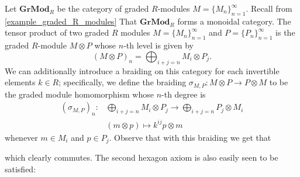 \begin{example}
    Let $\textbf{GrMod}_R$ be the category of graded $R$-modules 
    $M = \{M_n\}_{n = 1}^{\infty}$. Recall from 
    \ref{example_graded_R_modules} That $\textbf{GrMod}_R$ forms 
    a monoidal category.
    The tensor product 
    of two graded $R$ modules $M =\{M_n\}_{n=1}^{\infty}$ and $P = \{P_n\}_{n= 1}^{\infty}$ is the graded $R$-module $M\otimes P$ whose $n$-th level is given by
    \[
        (M \otimes P)_n = \bigoplus_{i + j = n}M_i \otimes P_j.
    \]  
    We can additionally introduce a braiding on this category for each invertible elements $k \in R$; specifically, we define the braiding 
    $\sigma_{M,P}: M \otimes P \to P \otimes M$ to be the graded module homomorphism whose $n$-th degree is 
    \begin{align*} 
        (\sigma_{M, P})_n: &\bigoplus_{i + j = n}M_i \otimes P_j
        \to 
        \bigoplus_{i + j = n} P_j \otimes M_i\\
        &(m \otimes p) \longmapsto k^{ij}p \otimes m
    \end{align*}
    whenever $m \in M_i$ and $p \in P_j$. 
    Observe that with this braiding we get that
    \begin{center}
    \end{center}
    which clearly commutes. The second hexagon axiom is also easily seen to be satisfied:
    \begin{center}
        \begin{tikzcd}[row sep = 0.25cm, column sep = 0.5cm]

\end{tikzcd}
\end{center}
\end{example}
